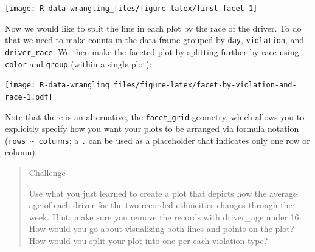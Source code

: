 \documentclass[]{book}
\newenvironment{Shaded}{\begin{snugshade}}{\end{snugshade}}
\newcommand{\DataTypeTok}[1]{\textcolor[rgb]{0.13,0.29,0.53}{#1}}
\newcommand{\KeywordTok}[1]{\textcolor[rgb]{0.13,0.29,0.53}{\textbf{#1}}}
\newcommand{\NormalTok}[1]{#1}
\newcommand{\OperatorTok}[1]{\textcolor[rgb]{0.81,0.36,0.00}{\textbf{#1}}}
\newcommand{\OtherTok}[1]{\textcolor[rgb]{0.56,0.35,0.01}{#1}}
\newcommand{\StringTok}[1]{\textcolor[rgb]{0.31,0.60,0.02}{#1}}
\begin{document}
\texttt{[image: R-data-wrangling\_files/figure-latex/first-facet-1]}

Now we would like to split the line in each plot by the race of the driver. To do that we need to make counts in the data frame grouped by \texttt{day}, \texttt{violation}, and \texttt{driver\_race}. We then make the faceted plot by splitting further by race using \texttt{color} and \texttt{group} (within a single plot):

\begin{Shaded}
\end{Shaded}

\texttt{[image: R-data-wrangling\_files/figure-latex/facet-by-violation-and-race-1.pdf]}

Note that there is an alternative, the \texttt{facet\_grid} geometry, which allows you to explicitly specify how you want your plots to be
arranged via formula notation (\texttt{rows\ \textasciitilde{}\ columns}; a \texttt{.} can be used as
a placeholder that indicates only one row or column).

\begin{quote}
Challenge

Use what you just learned to create a plot that depicts how the average age
of each driver for the two recorded ethnicities changes through the week.
Hint: make sure you remove the records with driver\_age under 16.
How would you go about visualizing both lines and points on the plot?
How would you split your plot into one per each violation type?
\end{quote}
\end{document}
